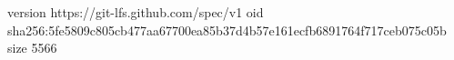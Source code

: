 version https://git-lfs.github.com/spec/v1
oid sha256:5fe5809c805cb477aa67700ea85b37d4b57e161ecfb6891764f717ceb075c05b
size 5566
